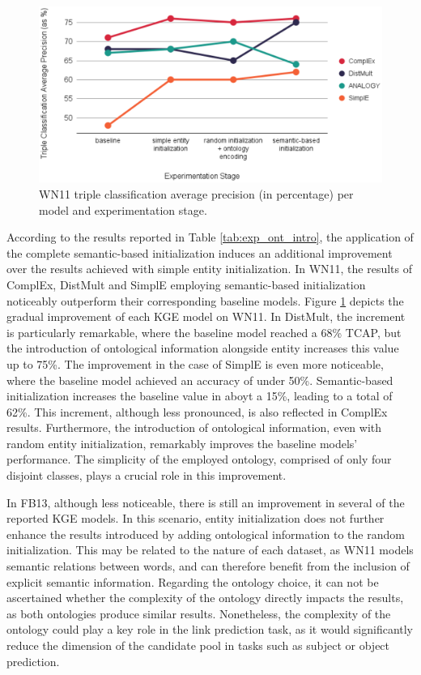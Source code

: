 \begin{figure}[t]
    \centering
    \includegraphics[width=.9\linewidth]{4_kbsintegrationdl/figures/WN_Comparison.eps}
    \caption{WN11 triple classification average precision (in percentage) per model and experimentation stage. }
    \label{fig:wn_stage_comparison}
\end{figure}

According to the results reported in Table \ref{tab:exp_ont_intro}, the application of the complete semantic-based initialization induces an additional improvement over the results achieved with simple entity initialization. In WN11, the results of ComplEx, DistMult and SimplE employing semantic-based initialization noticeably outperform their corresponding baseline models. Figure \ref{fig:wn_stage_comparison} depicts the gradual improvement of each KGE model on WN11. In DistMult, the increment is particularly remarkable, where the baseline model reached a 68\% TCAP, but the introduction of ontological information alongside entity increases this value up to 75\%. The improvement in the case of SimplE is even more noticeable, where the baseline model achieved an accuracy of under 50\%. Semantic-based initialization increases the baseline value in aboyt a 15\%, leading to a total of 62\%. This increment, although less pronounced, is also reflected in ComplEx results. Furthermore, the introduction of ontological information, even with random entity initialization, remarkably improves the baseline models' performance. The simplicity of the employed ontology, comprised of only four disjoint classes, plays a crucial role in this improvement. 

In FB13, although less noticeable, there is still an improvement in several of the reported KGE models. In this scenario, entity initialization does not further enhance the results introduced by adding ontological information to the random initialization. This may be related to the nature of each dataset, as WN11 models semantic relations between words, and can therefore benefit from the inclusion of explicit semantic information. Regarding the ontology choice, it can not be ascertained whether the complexity of the ontology directly impacts the results, as both ontologies produce similar results. Nonetheless, the complexity of the ontology could play a key role in the link prediction task, as it would significantly reduce the dimension of the candidate pool in tasks such as subject or object prediction.


